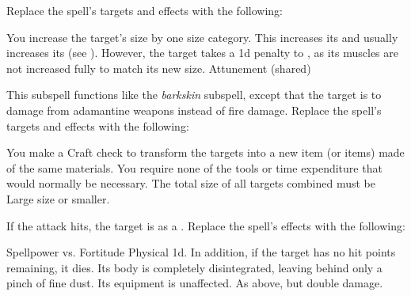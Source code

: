 Replace the spell's targets and effects with the following:
\begin{spellcontent}
\begin{augmenttargetinginfo}
\end{augmenttargetinginfo}
\begin{augmenteffects}
\spelleffect
You increase the target's size by one size category.
This increases its  and usually increases its  (see ).
However, the target takes a \minus1d penalty to , as its muscles are not increased fully to match its new size.
\spelldur Attunement (shared)
\end{augmenteffects}
\end{spellcontent}
This subspell functions like the \textit{barkskin} subspell, except that the target is  to damage from adamantine weapons instead of fire damage.
Replace the spell's targets and effects with the following:
\begin{spellcontent}
\begin{augmenttargetinginfo}
\end{augmenttargetinginfo}
\begin{augmenteffects}
\spelleffect
You make a Craft check to transform the targets into a new item (or items) made of the same materials.
You require none of the tools or time expenditure that would normally be necessary.
The total size of all targets combined must be Large size or smaller.
\end{augmenteffects}
\end{spellcontent}
If the attack hits, the target is  as a .
Replace the spell's effects with the following:
\begin{spellcontent}
\begin{augmenteffects}
\begin{spellattack}{Spellpower vs. Fortitude}
\spellsuccess
Physical  \plus1d.
In addition, if the target has no hit points remaining, it dies.
Its body is completely disintegrated, leaving behind only a pinch of fine dust.
Its equipment is unaffected.
\spellcritical
As above, but double damage.
\end{spellattack}
\end{augmenteffects}
\end{spellcontent}
